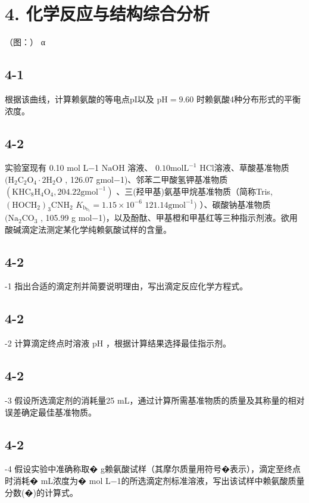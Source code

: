 \section*{4. 化学反应与结构综合分析}
（图：）
α

\subsection*{4-1}
根据该曲线，计算赖氨酸的等电点pI以及 $\mathrm { p H } = 9 . 6 0 $ 时赖氨酸4种分布形式的平衡浓度。

\subsection*{4-2}
实验室现有 0.10 mol L−1 $\mathrm { N a O H }$ 溶液、 $0 . 1 0 \mathrm { m o l } \mathrm { L } ^ { - 1 }$ HCl溶液、草酸基准物质 $\mathrm { ( H _ { 2 } C _ { 2 } O _ { 4 } { \cdot } 2 H _ { 2 } O }$ , 126.07 gmol−1)、邻苯⼆甲酸氢钾基准物质 $( \mathrm { K H C _ { 8 } H _ { 4 } O _ { 4 } } , 2 0 4 . 2 2 \mathrm { g } \mathrm { m o l ^ { - 1 } } )$ 、三(羟甲基)氨基甲烷基准物质（简称Tris,$\mathrm { ( H O C H _ { 2 } ) _ { 3 } C N H _ { 2 } }$ $K _ { \mathrm { b } } _ { \mathrm { b } } _ { \mathrm { \ell } } = 1 . 1 5 { \times } 1 0 ^ { - 6 }$ $1 2 1 . 1 4 \mathrm { g } \mathrm { m o l } ^ { - 1 } )$ ）、碳酸钠基准物质 $\mathrm { ( N a _ { 2 } C O _ { 3 } }$ , 105.99 g mol−1)，以及酚酞、甲基橙和甲基红等三种指⽰剂液。欲⽤酸碱滴定法测定某化学纯赖氨酸试样的含量。

\subsection*{4-2}
-1 指出合适的滴定剂并简要说明理由，写出滴定反应化学⽅程式。

\subsection*{4-2}
-2 计算滴定终点时溶液 $\mathrm { p H }$ ，根据计算结果选择最佳指⽰剂。

\subsection*{4-2}
-3 假设所选滴定剂的消耗量25 mL，通过计算所需基准物质的质量及其称量的相对误差确定最佳基准物质。

\subsection*{4-2}
-4 假设实验中准确称取� g赖氨酸试样（其摩尔质量⽤符号�表⽰），滴定⾄终点时消耗� mL浓度为� mol L−1的所选滴定剂标准溶液，写出该试样中赖氨酸质量分数(�)的计算式。
